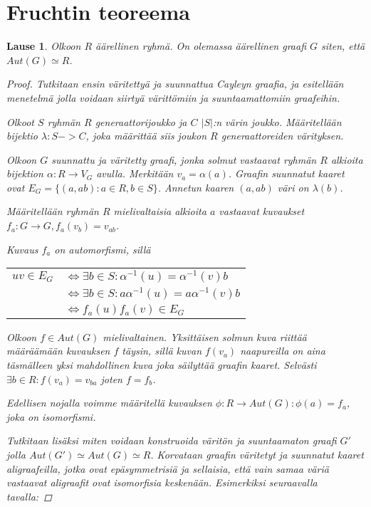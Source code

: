 \documentclass[a4paper, 12pt]{article}
\theoremstyle{definition}
\theoremstyle{plain}
\newtheorem{teor}[mydef]{Lause}
\begin{document}
\newpage

\section{Fruchtin teoreema}

\begin{teor}
Olkoon $R$ äärellinen ryhmä. On olemassa äärellinen graafi $G$ siten, että $Aut(G) \simeq R$.
\begin{proof}
Tutkitaan ensin väritettyä ja suunnattua Cayleyn graafia, ja esitellään menetelmä jolla voidaan siirtyä värittömiin ja suuntaamattomiin graafeihin.

Olkoot $S$ ryhmän $R$ generaattorijoukko ja $C$ $|S|$:n värin joukko. Määritellään bijektio $\lambda: S -> C$, joka määrittää siis joukon $R$ generaattoreiden värityksen.

Olkoon $G$ suunnattu ja väritetty graafi, jonka solmut vastaavat ryhmän $R$ alkioita bijektion $\alpha: R \rightarrow V_G$ avulla. Merkitään $v_a = \alpha(a)$. Graafin suunnatut kaaret ovat $E_G = \{ (a, ab) : a \in R, b \in S\}$. Annetun kaaren $(a, ab)$ väri on $\lambda(b)$.

Määritellään ryhmän $R$ mielivaltaisia alkioita $a$ vastaavat kuvaukset $f_a: G \rightarrow G, f_a(v_b) = v_{ab}$.

Kuvaus $f_a$ on automorfismi, sillä
\begin{center}
\begin{tabular}{r l}
$uv \in E_G$ & $\Leftrightarrow \exists b \in S: \alpha^{-1}(u) = \alpha^{-1}(v)b$ \\
& $\Leftrightarrow \exists b \in S: a\alpha^{-1}(u) = a\alpha^{-1}(v)b$ \\
& $\Leftrightarrow f_a(u)f_a(v) \in E_G$\\
\end{tabular}
\end{center}

Olkoon $f \in Aut(G)$ mielivaltainen. Yksittäisen solmun kuva riittää määräämään kuvauksen $f$ täysin, sillä kuvan $f(v_a)$ naapureilla on aina täsmälleen yksi mahdollinen kuva joka säilyttää graafin kaaret. Selvästi $\exists b \in R: f(v_a) = v_{ba}$ joten $f = f_b$.

Edellisen nojalla voimme määritellä kuvauksen $\phi: R \rightarrow Aut(G): \phi(a) = f_a$, joka on isomorfismi.

Tutkitaan lisäksi miten voidaan konstruoida väritön ja suuntaamaton graafi $G'$ jolla $Aut(G') \simeq Aut(G) \simeq R$. 
Korvataan graafin väritetyt ja suunnatut kaaret aligraafeilla, jotka ovat epäsymmetrisiä ja sellaisia, että vain samaa väriä vastaavat aligraafit ovat isomorfisia keskenään. Esimerkiksi seuraavalla tavalla:


\end{proof}
\end{teor}
\end{document}

